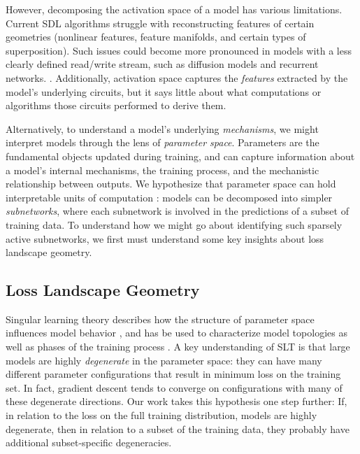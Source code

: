 \documentclass{article}
\theoremstyle{plain}
\theoremstyle{definition}
\theoremstyle{remark}
\begin{document}
However, decomposing the activation space of a model has various limitations.  Current SDL algorithms struggle with reconstructing features of certain geometries (nonlinear features, feature manifolds, and certain types of superposition)\cite{engels2024not,engels2024decomposing,merullo2024talking,lindsey2024sparse}. Such issues could become more pronounced in models with a less clearly defined read/write stream, such as diffusion models and recurrent networks. \cite{pascanu2013difficulty,ho2020denoising}.  Additionally, activation space captures the \textit{features} extracted by the model's underlying circuits, but it says little about what computations or algorithms those circuits performed to derive them.

Alternatively, to understand a model's underlying \textit{mechanisms}, we might interpret models through the lens of \textit{parameter space}. Parameters are the fundamental objects updated during training, and can capture information about a model's internal mechanisms, the training process, and the mechanistic relationship between outputs. We hypothesize that parameter space can hold interpretable units of computation \cite{sharkey2025open}: models can be decomposed into simpler \textit{subnetworks}, where each subnetwork is involved in the predictions of a subset of training data. To understand how we might go about identifying such sparsely active subnetworks, we first must understand some key insights about loss landscape geometry.


\subsection{Loss Landscape Geometry}\label{subsec:loss_landscape_geometry}

Singular learning theory describes how the structure of parameter space influences model behavior \cite{watanabe2000algebraic,watanabe2005algebraic}, and has be used to characterize model topologies \cite{bushnaq2024using,lau2023local} as well as phases of the training process \cite{wang2024loss,hoogland2024developmental,davies2023unifying}.  A key understanding of SLT is that large models are highly \textit{degenerate} \cite{wei2022deep,watanabe2007almost} in the parameter space: they can have many different parameter configurations that result in minimum loss on the training set. In fact, gradient descent tends to converge on configurations with many of these degenerate directions.  Our work takes this hypothesis one step further: If, in relation to the loss on the full training distribution, models are highly degenerate, then in relation to a subset of the training data, they probably have additional subset-specific degeneracies. 
\end{document}
